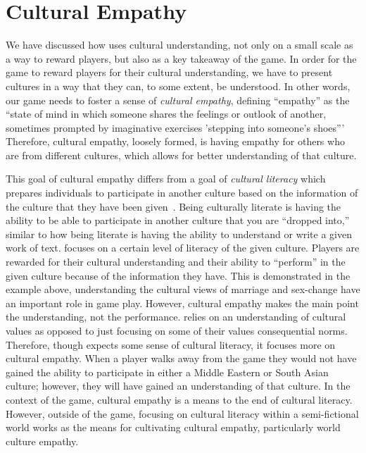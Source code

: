 \documentclass[a4paper]{article}
\begin{document}
\section{Cultural Empathy}

We have discussed how \totan{} uses cultural understanding, not only on a
small scale as a way to reward players, but also as a key takeaway of
the game. In order for the game to reward players for their cultural
understanding, we have to present cultures in a way that they can, to
some extent, be understood. In other words, our game needs to foster a
sense of \textit{cultural empathy}, defining ``empathy'' as 
the ``state of mind in which someone shares the feelings or outlook of
another, sometimes prompted by imaginative exercises 'stepping into
someone's shoes'''~\citep[p.242]{Honderich2005}
Therefore, cultural
empathy, loosely formed, is having empathy for others who are from
different cultures, which allows for better understanding of that
culture.

This goal of cultural empathy differs from a goal of \textit{cultural
literacy} which prepares individuals to participate in another culture
based on the information of the culture that they have been 
given~\citep[p.165]{Hirsch1983}. Being culturally literate is having the
ability to be able to participate in another culture that you are
``dropped into,'' similar to how being literate is having the ability to
understand or write a given work of text.  \totan{} focuses on a certain
level of literacy of the given culture. Players are rewarded for their
cultural understanding and their ability to ``perform'' in the given
culture because of the information they have. This is demonstrated in
the example above, understanding the cultural views of marriage and
sex-change have an important role in game play. However, cultural
empathy makes the main point the understanding, not the
performance. \totan{} relies on an understanding of cultural values as
opposed to just focusing on some of their values consequential
norms. Therefore, though \totan{} expects some sense of cultural
literacy, it focuses more on cultural empathy. When a player walks
away from the game they would not have gained the ability to
participate in either a Middle Eastern or South Asian culture;
however, they will have gained an understanding of that culture. 
In the context of the
game, cultural empathy is a means to the end of cultural
literacy. However, outside of the game, focusing on cultural literacy
within a semi-fictional world works as the means for cultivating
cultural empathy, particularly world culture empathy.
\end{document}
